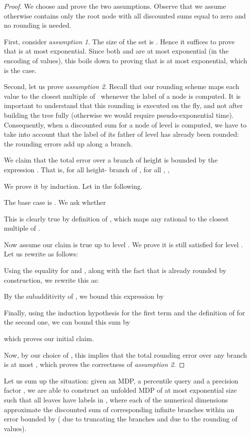\documentclass{llncs}
\begin{document}
\begin{proof}
We choose  and prove the two assumptions. Observe that we assume  otherwise  contains only the root node with all discounted sums equal to zero and no rounding is needed.

First, consider \textit{assumption 1}. The size of the set is .
Hence it suffices to prove that  is at most exponential. Since both  and  are at most exponential (in the encoding of values), this boils down to proving that  is at most exponential, which is the case.

Second, let us prove \textit{assumption 2}. Recall that our rounding scheme maps each value to the closest multiple of~ whenever the label of a node is computed. It is important to understand that this rounding is executed on the fly, and not after building the tree  fully (otherwise we would require pseudo-exponential time). Consequently, when a discounted sum for a node of level  is computed, we have to take into account that the label of its father of level  has already been rounded: the rounding errors add up along a branch.

We claim that the total error over a branch of height  is bounded by the expression . That is, for all height- branch  of , for all , ,

We prove it by induction. Let  in the following.

The base case is . We ask whether

This is clearly true by definition of , which maps any rational to the closest multiple of .

Now assume our claim is true up to level . We prove it is still satisfied for level . Let us rewrite  as follows:

Using the equality  for  and , along with the fact that  is already rounded by construction, we rewrite this as:

By the subadditivity of , we bound this expression by

Finally, using the induction hypothesis for the first term and the definition of  for the second one, we can bound this sum by

which proves our initial claim.

Now, by our choice of , this implies that the total rounding error over any branch is at most , which proves the correctness of \textit{assumption 2}.
\end{proof}

Let us sum up the situation: given an MDP, a percentile query and a precision factor , we are able to construct an unfolded MDP  of at most exponential size such that all leaves have labels in , where each of the  numerical dimensions approximate the discounted sum of corresponding infinite branches within an error bounded by  ( due to truncating the branches and  due to the rounding of values).
\end{document}
